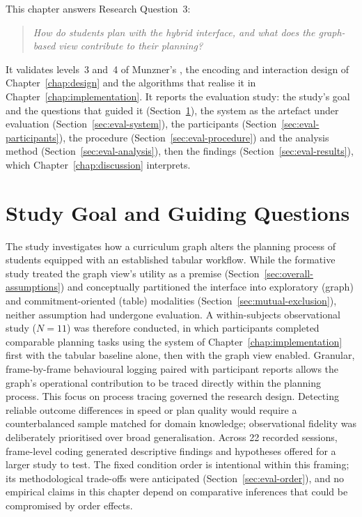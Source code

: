\label{chap:evaluation}
This chapter answers Research Question~3:

\begin{quote}
\textit{How do students plan with the hybrid interface, and what does the graph-based view contribute to their planning?}
\end{quote}

It validates levels~3 and~4 of Munzner's , the encoding and interaction design of Chapter~\ref{chap:design} and the algorithms that realise it in Chapter~\ref{chap:implementation}. It reports the evaluation study: the study's goal and the questions that guided it (Section~\ref{sec:eval-design}), the system as the artefact under evaluation (Section~\ref{sec:eval-system}), the participants (Section~\ref{sec:eval-participants}), the procedure (Section~\ref{sec:eval-procedure}) and the analysis method (Section~\ref{sec:eval-analysis}), then the findings (Section~\ref{sec:eval-results}), which Chapter~\ref{chap:discussion} interprets.

\section{Study Goal and Guiding Questions}
\label{sec:eval-design}

The study investigates how a curriculum graph alters the planning process of students equipped with an established tabular workflow. While the formative study treated the graph view's utility as a premise (Section~\ref{sec:overall-assumptions}) and conceptually partitioned the interface into exploratory (graph) and commitment-oriented (table) modalities (Section~\ref{sec:mutual-exclusion}), neither assumption had undergone evaluation. A within-subjects observational study ($N=11$) was therefore conducted, in which participants completed comparable planning tasks using the system of Chapter~\ref{chap:implementation} first with the tabular baseline alone, then with the graph view enabled. Granular, frame-by-frame behavioural logging paired with participant reports allows the graph's operational contribution to be traced directly within the planning process. This focus on process tracing governed the research design. Detecting reliable outcome differences in speed or plan quality would require a counterbalanced sample matched for domain knowledge; observational fidelity was deliberately prioritised over broad generalisation. Across 22 recorded sessions, frame-level coding generated descriptive findings and hypotheses offered for a larger study to test. The fixed condition order is intentional within this framing; its methodological trade-offs were anticipated (Section~\ref{sec:eval-order}), and no empirical claims in this chapter depend on comparative inferences that could be compromised by order effects.

